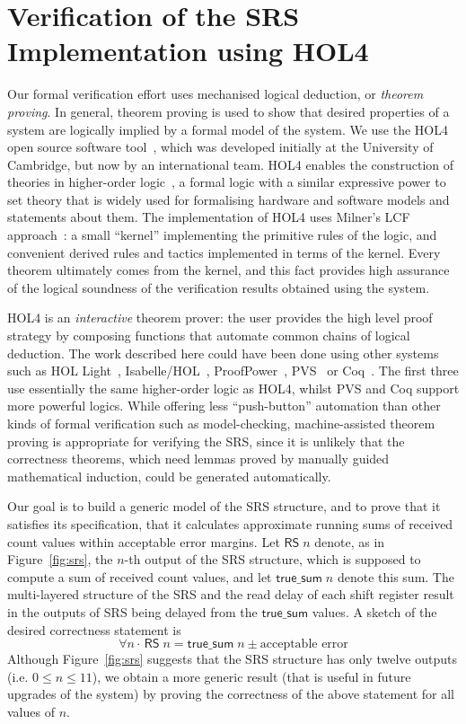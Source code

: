 \documentclass{llncs}
\begin{document}
\section{Verification of the SRS Implementation using HOL4}
\label{sec-verification}

Our formal verification effort uses mechanised logical deduction, or \emph{theorem proving}.
In general, theorem proving is used to show that desired properties of a system are logically implied by a formal model of the system.
We use the HOL4 open source software tool~\cite{HOL4,DBLP:conf/tphol/SlindN08}, which was developed initially at the University of Cambridge, but now by an international team.
HOL4 enables the construction of theories in higher-order logic~\cite{DBLP:journals/jsyml/Church40}, a formal logic with a similar expressive power to set theory that is widely used for formalising hardware and software models and statements about them.
The implementation of HOL4 uses Milner's LCF approach~\cite{Milner:1972:LCF:891954}: a small ``kernel'' implementing the primitive rules of the logic, and convenient derived rules and tactics implemented in terms of the kernel.
Every theorem ultimately comes from the kernel, and this fact provides high assurance of the logical soundness of the verification results obtained using the system.

HOL4 is an \emph{interactive} theorem prover: the user provides the high level proof strategy by composing functions that automate common chains of logical deduction.
The work described here could have been done using other systems such as HOL Light~\cite{HOLLight,DBLP:conf/tphol/Harrison09a}, Isabelle/HOL~\cite{Isabelle}, ProofPower~\cite{ProofPower}, PVS~\cite{PVS,DBLP:conf/tphol/OwreS08} or Coq~\cite{Coq}.
The first three use essentially the same higher-order logic as HOL4, whilst PVS and Coq support more powerful logics.
While offering less ``push-button'' automation than other kinds of formal verification such as model-checking, machine-assisted theorem proving is appropriate for verifying the SRS, since it is unlikely that the correctness theorems, which need lemmas proved by manually guided mathematical induction, could be generated automatically.

Our goal is to build a generic model of the SRS structure, and to prove that it satisfies its specification, that it calculates approximate running sums of received count values within acceptable error margins.
Let $\mathsf{RS}\;n$ denote, as in Figure~\ref{fig:srs}, the $n$-th output of the SRS structure, which is supposed to compute a sum of received count values, and let $\mathsf{true\_sum}\;n$ denote this sum.
The multi-layered structure of the SRS and the read delay of each shift register result in the outputs of SRS being delayed from the $\mathsf{true\_sum}$ values.
A sketch of the desired correctness statement is \[\forall{n} \cdot \, \mathsf{RS}\;n= \mathsf{true\_sum}\; n \pm\text{acceptable error}\]
Although Figure~\ref{fig:srs} suggests that the SRS structure has only twelve outputs  (i.e. $0\leq{n}\leq11$), we obtain a more generic result (that is useful in future upgrades of the system) by proving the correctness of the above statement for all values of $n$.
\end{document}
